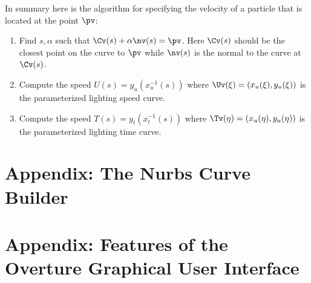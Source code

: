 \documentclass[12pt]{article}
\begin{document}
In summary here is the algorithm for specifying the velocity of a particle that is located at the
point $\pv$:
\begin{enumerate}
 \item Find $s,\alpha$ such that $\Cv(s)+\alpha\nv(s)=\pv$. Here 
$\Cv(s)$ should be the closest point on the curve to $\pv$ while $\nv(s)$ is the normal to
the curve at $\Cv(s)$. 
  \item Compute the speed $U(s) = y_u(x_u^{-1}(s))$ where $\Uv(\xi)=(x_u(\xi),y_u(\xi))$
  is the parameterized lighting speed curve.
  \item Compute the speed $T(s) = y_t(x_t^{-1}(s))$ where $\Tv(\eta)=(x_u(\eta),y_u(\eta))$
  is the parameterized lighting time curve.
\end{enumerate}



\appendix
\clearpage
\section{Appendix: The Nurbs Curve Builder}\label{app:NurbsCurveBuilder}





\clearpage
\section{Appendix: Features of the Overture Graphical User Interface}
\label{app:mouseButtons}



\vfill\eject



\printindex
\end{document}
